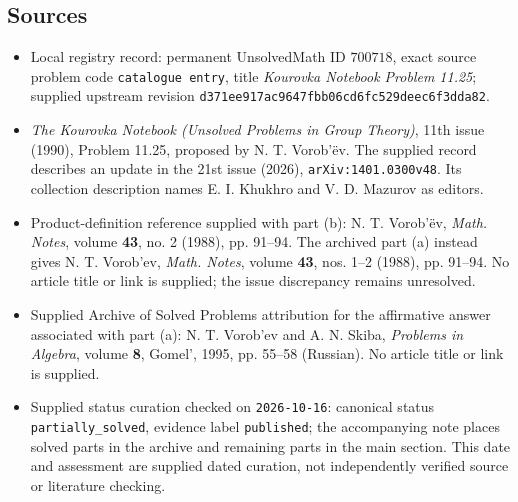 \documentclass[11pt]{article}
\begin{document}
\subsection{Sources}
\begin{itemize}
\item Local registry record: permanent UnsolvedMath ID \(700718\), exact source problem code \texttt{catalogue entry}, title \emph{Kourovka Notebook Problem 11.25}; supplied upstream revision \texttt{d371ee917ac9647fbb06cd6fc529deec6f3dda82}.
\item \emph{The Kourovka Notebook (Unsolved Problems in Group Theory)}, 11th issue (1990), Problem 11.25, proposed by N. T. Vorob'\"ev. The supplied record describes an update in the 21st issue (2026), \texttt{arXiv:1401.0300v48}. Its collection description names E. I. Khukhro and V. D. Mazurov as editors.
\item Product-definition reference supplied with part (b): N. T. Vorob'\"ev, \emph{Math. Notes}, volume \textbf{43}, no. 2 (1988), pp. 91--94. The archived part (a) instead gives N. T. Vorob'ev, \emph{Math. Notes}, volume \textbf{43}, nos. 1--2 (1988), pp. 91--94. No article title or link is supplied; the issue discrepancy remains unresolved.
\item Supplied Archive of Solved Problems attribution for the affirmative answer associated with part (a): N. T. Vorob'ev and A. N. Skiba, \emph{Problems in Algebra}, volume \textbf{8}, Gomel', 1995, pp. 55--58 (Russian). No article title or link is supplied.
\item Supplied status curation checked on \texttt{2026-10-16}: canonical status \texttt{partially\_solved}, evidence label \texttt{published}; the accompanying note places solved parts in the archive and remaining parts in the main section. This date and assessment are supplied dated curation, not independently verified source or literature checking.
\end{itemize}
\end{document}
